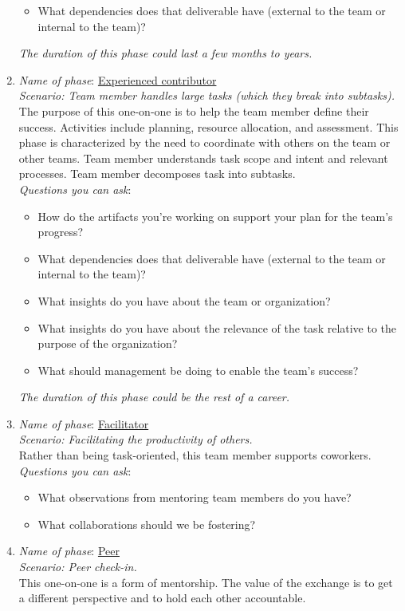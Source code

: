 \begin{enumerate}
\begin{itemize}
        \item What dependencies does that deliverable have (external to the team or internal to the team)?
    \end{itemize}
\textit{The duration of this phase could last a few months to years.}
    \item \textit{Name of phase}: \underline{Experienced contributor}\\
    \textit{Scenario: Team member handles large tasks (which they break into subtasks). }\\
    The purpose of this one-on-one is to help the team member define their success. Activities include planning, resource allocation, and assessment. This phase is characterized by the need to coordinate with others on the team or other teams. Team member understands task scope and intent and relevant processes. Team member decomposes task into subtasks.\\
    \textit{Questions you can ask}:
    \begin{itemize}
        \item How do the artifacts you're working on support your plan for the team's progress?
        \item What dependencies does that deliverable have (external to the team or internal to the team)?
        \item What insights do you have about the team or organization?
        \item What insights do you have about the relevance of the task relative to the purpose of the organization?
        \item What should management be doing to enable the team's success?
    \end{itemize}
\textit{The duration of this phase could be the rest of a career.}
    \item \textit{Name of phase}: \underline{Facilitator}\\
    \textit{Scenario: Facilitating the productivity of others.}\\
    Rather than being task-oriented, this team member supports coworkers. \\
    \textit{Questions you can ask}:
    \begin{itemize}
        \item What observations from mentoring team members do you have?
        \item What collaborations should we be fostering?
    \end{itemize}
    \item \textit{Name of phase}: \underline{Peer}\\
    \textit{Scenario: Peer check-in.}\\ 
    This one-on-one is a form of mentorship. The value of the exchange is to get a different perspective and to hold each other accountable.
\end{enumerate}

